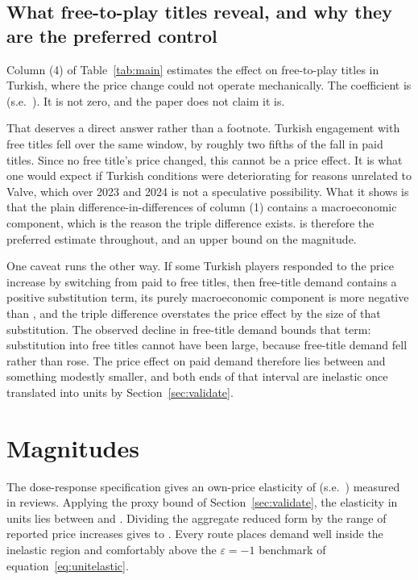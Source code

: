 \documentclass[11pt]{article}
\begin{document}
\subsection{What free-to-play titles reveal, and why they are the preferred control}

Column (4) of Table~\ref{tab:main} estimates the effect on free-to-play titles in Turkish, where
the price change could not operate mechanically. The coefficient is \bFree{} (s.e.\ \seFree). It
is not zero, and the paper does not claim it is.

That deserves a direct answer rather than a footnote. Turkish engagement with free titles fell
over the same window, by roughly two fifths of the fall in paid titles. Since no free title's price
changed, this cannot be a price effect. It is what one would expect if Turkish conditions were
deteriorating for reasons unrelated to Valve, which over 2023 and 2024 is not a speculative
possibility. What it shows is that the plain difference-in-differences of column (1)
contains a macroeconomic component, which is the reason the triple difference exists. \bDDD{} is
therefore the preferred estimate throughout, and \bDiD{} an upper bound on the magnitude.

One caveat runs the other way. If some Turkish players responded to the price
increase by switching from paid to free titles, then free-title demand contains a positive
substitution term, its purely macroeconomic component is more negative than \bFree, and the triple
difference overstates the price effect by the size of that substitution. The observed decline in free-title demand bounds that term: substitution
into free titles cannot have been large, because free-title demand fell rather than rose. The price
effect on paid demand therefore lies between \bDDD{} and something modestly smaller, and both ends
of that interval are inelastic once translated into units by Section~\ref{sec:validate}.

\section{Magnitudes}\label{sec:magnitudes}

The dose-response specification gives an own-price elasticity of \bDose{} (s.e.\ \seDose)
measured in reviews. Applying the proxy bound of Section~\ref{sec:validate}, the elasticity in
units lies between \epsUnitsLo{} and \epsUnitsHi. Dividing the aggregate reduced form by the range
of reported price increases gives \epsLo{} to \epsHi. Every route places demand well inside the
inelastic region and comfortably above the $\varepsilon = -1$ benchmark of
equation~\eqref{eq:unitelastic}.
\end{document}
